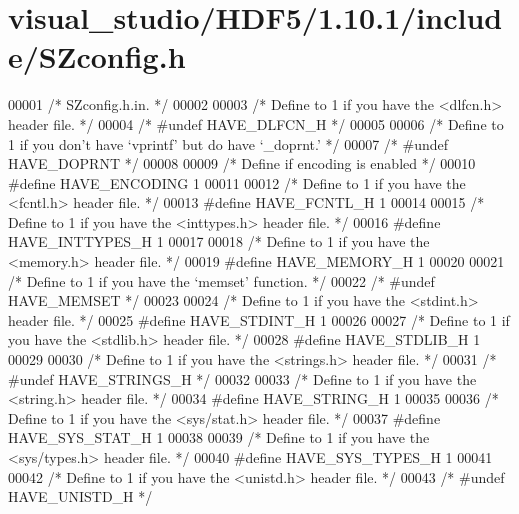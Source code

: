 \hypertarget{visual__studio_2_h_d_f5_21_810_81_2include_2_s_zconfig_8h_source}{}\section{visual\+\_\+studio/\+H\+D\+F5/1.10.1/include/\+S\+Zconfig.h}
\label{visual__studio_2_h_d_f5_21_810_81_2include_2_s_zconfig_8h_source}

\begin{DoxyCode}
00001 \textcolor{comment}{/* SZconfig.h.in.  */}
00002 
00003 \textcolor{comment}{/* Define to 1 if you have the <dlfcn.h> header file. */}
00004 \textcolor{comment}{/* #undef HAVE\_DLFCN\_H */}
00005 
00006 \textcolor{comment}{/* Define to 1 if you don't have `vprintf' but do have `\_doprnt.' */}
00007 \textcolor{comment}{/* #undef HAVE\_DOPRNT */}
00008 
00009 \textcolor{comment}{/* Define if encoding is enabled */}
00010 \textcolor{preprocessor}{#define HAVE\_ENCODING 1}
00011 
00012 \textcolor{comment}{/* Define to 1 if you have the <fcntl.h> header file. */}
00013 \textcolor{preprocessor}{#define HAVE\_FCNTL\_H 1}
00014 
00015 \textcolor{comment}{/* Define to 1 if you have the <inttypes.h> header file. */}
00016 \textcolor{preprocessor}{#define HAVE\_INTTYPES\_H 1}
00017 
00018 \textcolor{comment}{/* Define to 1 if you have the <memory.h> header file. */}
00019 \textcolor{preprocessor}{#define HAVE\_MEMORY\_H 1}
00020 
00021 \textcolor{comment}{/* Define to 1 if you have the `memset' function. */}
00022 \textcolor{comment}{/* #undef HAVE\_MEMSET */}
00023 
00024 \textcolor{comment}{/* Define to 1 if you have the <stdint.h> header file. */}
00025 \textcolor{preprocessor}{#define HAVE\_STDINT\_H 1}
00026 
00027 \textcolor{comment}{/* Define to 1 if you have the <stdlib.h> header file. */}
00028 \textcolor{preprocessor}{#define HAVE\_STDLIB\_H 1}
00029 
00030 \textcolor{comment}{/* Define to 1 if you have the <strings.h> header file. */}
00031 \textcolor{comment}{/* #undef HAVE\_STRINGS\_H */}
00032 
00033 \textcolor{comment}{/* Define to 1 if you have the <string.h> header file. */}
00034 \textcolor{preprocessor}{#define HAVE\_STRING\_H 1}
00035 
00036 \textcolor{comment}{/* Define to 1 if you have the <sys/stat.h> header file. */}
00037 \textcolor{preprocessor}{#define HAVE\_SYS\_STAT\_H 1}
00038 
00039 \textcolor{comment}{/* Define to 1 if you have the <sys/types.h> header file. */}
00040 \textcolor{preprocessor}{#define HAVE\_SYS\_TYPES\_H 1}
00041 
00042 \textcolor{comment}{/* Define to 1 if you have the <unistd.h> header file. */}
00043 \textcolor{comment}{/* #undef HAVE\_UNISTD\_H */}

\end{DoxyCode}
